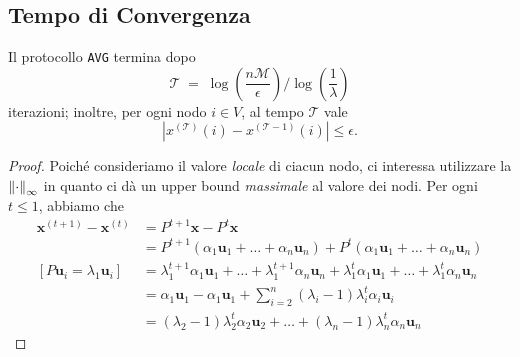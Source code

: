 \newpage

\subsection{Tempo di Convergenza}
\begin{teorema}\label{teo:terminazione}
    Il protocollo \texttt{AVG} termina dopo
    \[
    \mathcal{T} \;=\; \log\left(\frac{n\mathcal{M}}{\epsilon}\right) / \log\left(\frac{1}{\lambda}\right)
    \]
    iterazioni; inoltre, per ogni nodo \(i \in V\), al tempo \(\mathcal{T}\) vale
    \[
    \left|x^{(\mathcal{T})}(i)-x^{(\mathcal{T}-1)}(i)\right| \le \epsilon .
    \]
    \begin{proof}
        Poiché consideriamo il valore \textit{locale} di ciacun nodo, ci interessa utilizzare la $\norm{\cdot}_{\infty}$ in quanto ci dà un upper bound \textit{massimale} al valore dei nodi. Per ogni $t \leq 1$, abbiamo che
        \begin{equation}\label{eq:tempo_convergenza}
        \begin{aligned}
            \mathbf{x}^{(t+1)} - \mathbf{x}^{(t)} &= P^{t+1}\mathbf{x} - P^t\mathbf{x} \\
            &= P^{t+1}(\alpha_1\mathbf{u}_1 + \dots + \alpha_n\mathbf{u}_n) + P^{t}(\alpha_1\mathbf{u}_1 + \dots + \alpha_n\mathbf{u}_n) \\
            [P\mathbf{u}_i = \lambda_1\mathbf{u}_i] &= \lambda_1^{t+1}\alpha_1\mathbf{u}_1 + \dots + \lambda_1^{t+1}\alpha_n\mathbf{u}_n + \lambda_1^{t}\alpha_1\mathbf{u}_1 + \dots + \lambda_1^{t}\alpha_n\mathbf{u}_n \\
            &= \alpha_1\mathbf{u}_1 - \alpha_1\mathbf{u}_1 + \sum_{i = 2}^{n} (\lambda_i - 1)\lambda_i^t\alpha_i\mathbf{u}_i \\
            &= (\lambda_2 - 1)\lambda_2^t\alpha_2\mathbf{u}_2 + \dots + (\lambda_n - 1)\lambda_n^t\alpha_n\mathbf{u}_n
        \end{aligned}
        \end{equation}


\end{proof}
\end{teorema}
